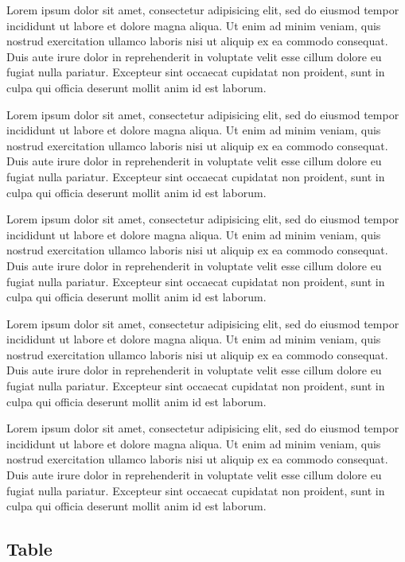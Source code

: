 \documentclass[10pt,a4paper,extrafontsizes,oldfontcommands,oneside]{memoir}
\begin{document}
Lorem ipsum dolor sit amet, consectetur adipisicing elit, sed do eiusmod tempor incididunt ut labore et dolore magna aliqua. Ut enim ad minim veniam, quis nostrud exercitation ullamco laboris nisi ut aliquip ex ea commodo consequat. Duis aute irure dolor in reprehenderit in voluptate velit esse cillum dolore eu fugiat nulla pariatur. Excepteur sint occaecat cupidatat non proident, sunt in culpa qui officia deserunt mollit anim id est laborum.

Lorem ipsum dolor sit amet, consectetur adipisicing elit, sed do eiusmod tempor incididunt ut labore et dolore magna aliqua. Ut enim ad minim veniam, quis nostrud exercitation ullamco laboris nisi ut aliquip ex ea commodo consequat. Duis aute irure dolor in reprehenderit in voluptate velit esse cillum dolore eu fugiat nulla pariatur. Excepteur sint occaecat cupidatat non proident, sunt in culpa qui officia deserunt mollit anim id est laborum.

Lorem ipsum dolor sit amet, consectetur adipisicing elit, sed do eiusmod tempor incididunt ut labore et dolore magna aliqua. Ut enim ad minim veniam, quis nostrud exercitation ullamco laboris nisi ut aliquip ex ea commodo consequat. Duis aute irure dolor in reprehenderit in voluptate velit esse cillum dolore eu fugiat nulla pariatur. Excepteur sint occaecat cupidatat non proident, sunt in culpa qui officia deserunt mollit anim id est laborum.

Lorem ipsum dolor sit amet, consectetur adipisicing elit, sed do eiusmod tempor incididunt ut labore et dolore magna aliqua. Ut enim ad minim veniam, quis nostrud exercitation ullamco laboris nisi ut aliquip ex ea commodo consequat. Duis aute irure dolor in reprehenderit in voluptate velit esse cillum dolore eu fugiat nulla pariatur. Excepteur sint occaecat cupidatat non proident, sunt in culpa qui officia deserunt mollit anim id est laborum.

Lorem ipsum dolor sit amet, consectetur adipisicing elit, sed do eiusmod tempor incididunt ut labore et dolore magna aliqua. Ut enim ad minim veniam, quis nostrud exercitation ullamco laboris nisi ut aliquip ex ea commodo consequat. Duis aute irure dolor in reprehenderit in voluptate velit esse cillum dolore eu fugiat nulla pariatur. Excepteur sint occaecat cupidatat non proident, sunt in culpa qui officia deserunt mollit anim id est laborum.


\subsection{Table} %
\label{sub:table2}
\end{document}
